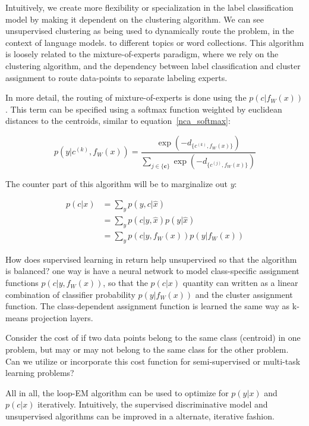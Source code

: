 \documentclass{article}
\begin{document}
Intuitively, we create more flexibility or specialization in the label classification model by making it dependent on the clustering algorithm. We can see unsupervised clustering as being used to dynamically route the problem, in the context of language models. to different topics or word collections. This algorithm is loosely related to the mixture-of-experts paradigm, 
where we rely on the clustering algorithm, and the dependency between label classification and cluster assignment to route data-points to separate labeling experts. 

In more detail, the routing of mixture-of-experts is done using the $p(c | f_W(x))$. This term can be specified using a softmax function weighted by euclidean distances to the centroids, similar to equation~\ref{nca_softmax}: 

\begin{equation} 
p(y | c^{(k)}, f_W(x)) = \frac{\exp(-d_{\{c^{(k)}, f_W(x)\}})}{\sum_{j\in \{\mathbf{c}\}} \exp(-d_{\{c^{(j)}, f_W(x)\}})} 
\end{equation} 

The counter part of this algorithm will be to marginalize out $y$: 

\begin{align} 
\label{c_y_depend_equation} 
p(c | x) &= \sum_y p(y, c | \hat{x}) \\
	    &= \sum_y p(c | y, \hat{x}) p(y | \hat{x}) \\ 
	    &= \sum_y p(c | y, f_W(x)) p(y | f_W(x)) 
\end{align} 

How does supervised learning in return help unsupervised so that the algorithm is balanced? one way is have a neural 
network to model class-specific assignment functions $p(c | y, f_W(x))$, so that the $p(c | x)$ quantity can written as a 
linear combination of classifier probability $p(y | f_W(x))$ and the cluster assignment function. The class-dependent assignment function
is learned the same way as k-means projection layers. 

Consider the cost of if two data points belong to the same class (centroid) in one problem, but may or may not 
belong to the same class for the other problem. Can we utilize or incorporate this cost function for semi-supervised 
or multi-task learning problems? 

All in all, the loop-EM algorithm can be used to optimize for $p(y | x)$ and $p(c | x)$ iteratively. Intuitively, the supervised discriminative model and 
unsupervised algorithms can be improved in a alternate, iterative fashion. 
\end{document}
